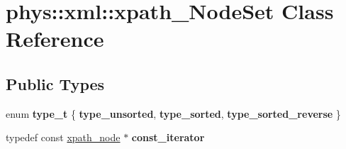 \hypertarget{classphys_1_1xml_1_1xpath__NodeSet}{
\section{phys::xml::xpath\_\-NodeSet Class Reference}
\label{dc/d32/classphys_1_1xml_1_1xpath__NodeSet}
}
\subsection*{Public Types}
\begin{DoxyCompactItemize}
\item 
enum {\bfseries type\_\-t} \{ {\bfseries type\_\-unsorted}, 
{\bfseries type\_\-sorted}, 
{\bfseries type\_\-sorted\_\-reverse}
 \}
\item 
\hypertarget{classphys_1_1xml_1_1xpath__NodeSet_a4a86eb664644f653fcf01755c1675ae0}{
typedef const \hyperlink{classphys_1_1xml_1_1xpath__node}{xpath\_\-node} $\ast$ {\bfseries const\_\-iterator}}
\label{dc/d32/classphys_1_1xml_1_1xpath__NodeSet_a4a86eb664644f653fcf01755c1675ae0}

\end{DoxyCompactItemize}
